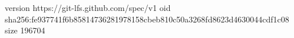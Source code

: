 version https://git-lfs.github.com/spec/v1
oid sha256:fe937741f6b85814736281978158cbeb810c50a3268fd8623d4630044cdf1c08
size 196704
